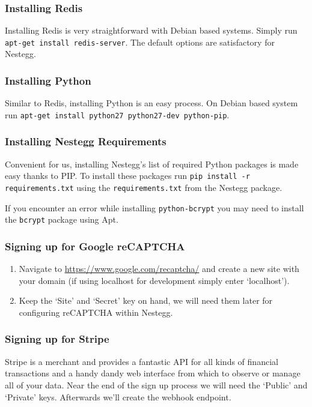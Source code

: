 \documentclass[11pt]{article}
\newcommand{\cmd}[1]{\textcolor{code}{\texttt{#1}}}
\begin{document}
			\subsubsection{Installing Redis}
				Installing Redis is very straightforward with Debian based systems. Simply run \cmd{apt-get install redis-server}. The default options are satisfactory for Nestegg.
			\subsubsection{Installing Python}
				Similar to Redis, installing Python is an easy process. On Debian based system run \cmd{apt-get install python27 python27-dev python-pip}.
			\subsubsection{Installing Nestegg Requirements}
				Convenient for us, installing Nestegg's list of required Python packages is made easy thanks to PIP. To install these packages run \cmd{pip install -r requirements.txt} using the \cmd{requirements.txt} from the Nestegg package.
				
				If you encounter an error while installing \cmd{python-bcrypt} you may need to install the \cmd{bcrypt} package using Apt.
			\subsubsection{Signing up for Google reCAPTCHA}
				\begin{enumerate}
					\item Navigate to \url{https://www.google.com/recaptcha/} and create a new site with your domain (if using localhost for development simply enter `localhost').
					\item Keep the `Site' and `Secret' key on hand, we will need them later for configuring reCAPTCHA within Nestegg.				
				\end{enumerate}
				

			\subsubsection{Signing up for Stripe}
				Stripe is a merchant and provides a fantastic API for all kinds of financial transactions and a handy dandy web interface from which to observe or manage all of your data. Near the end of the sign up process we will need the `Public' and `Private' keys. Afterwards we'll create the webhook endpoint.
				
\end{document}
